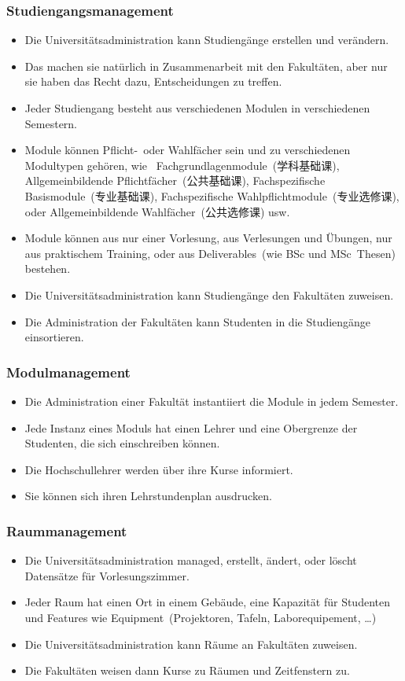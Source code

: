 \documentclass[aspectratio=169,mathserif,notheorems]{beamer}%
\begin{document}
\begin{frame}%
\frametitle{Studiengangsmanagement}%
%
\begin{itemize}%
\item Die Universitätsadministration kann Studiengänge erstellen und verändern.%
\item<2-> Das machen sie natürlich in Zusammenarbeit mit den Fakultäten, aber nur sie haben das Recht dazu, Entscheidungen zu treffen.%
%
\item<3-> Jeder Studiengang besteht aus verschiedenen Modulen in verschiedenen Semestern.%
%
\item<4-> Module können Pflicht-\ oder Wahlfächer sein und zu verschiedenen Modultypen gehören, wie \DEzB\ Fachgrundlagenmodule~(学科基础课),
Allgemeinbildende Pflichtfächer~(公共基础课), Fachspezifische Basismodule~(专业基础课), Fachspezifische Wahlpflichtmodule~(专业选修课), oder Allgemeinbildende Wahlfächer~(公共选修课) usw.%
%
\item<5-> Module können aus nur einer Vorlesung, aus Verlesungen und Übungen, nur aus praktischem Training, oder aus Deliverables~(wie BSc und MSc~Thesen) bestehen.%
%
\item<6-> Die Universitätsadministration kann Studiengänge den Fakultäten zuweisen.%
%
\item<7-> Die Administration der Fakultäten kann Studenten in die Studiengänge einsortieren.
\end{itemize}%
\end{frame}%
%
\begin{frame}%
\frametitle{Modulmanagement}%
\begin{itemize}%
\item Die Administration einer Fakultät instantiiert die Module in jedem Semester.%
%
\item<2-> Jede Instanz eines Moduls hat einen Lehrer und eine Obergrenze der Studenten, die sich einschreiben können.%
%
\item<3-> Die Hochschullehrer werden über ihre Kurse informiert.%
%
\item<4-> Sie können sich ihren Lehrstundenplan ausdrucken.%
\end{itemize}%
\end{frame}%
%
\begin{frame}%
\frametitle{Raummanagement}%
\begin{itemize}%
\item Die Universitätsadministration managed, erstellt, ändert, oder löscht Datensätze für Vorlesungszimmer.%
%
\item<2-> Jeder Raum hat einen Ort in einem Gebäude, eine Kapazität für Studenten und Features wie Equipment~(Projektoren, Tafeln, Laborequipement, \dots)%
%
\item<3-> Die Universitätsadministration kann Räume an Fakultäten zuweisen.%
%
\item<4-> Die Fakultäten weisen dann Kurse zu Räumen und Zeitfenstern zu.%
\end{itemize}%
\end{frame}%
\end{document}
